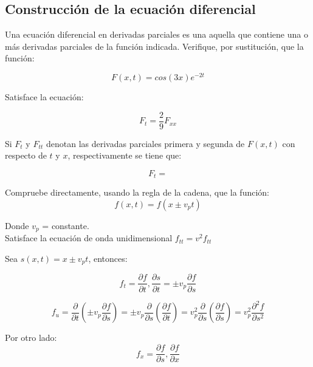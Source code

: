 \documentclass[]{article}
\begin{document}
\subsection{Construcción de la ecuación diferencial}

Una ecuación diferencial en derivadas parciales es una aquella que contiene una o más derivadas parciales de la función indicada. Verifique, por sustitución, que la función:

\begin{equation}
F(x,t)=cos(3x)e^{-2t}
\end{equation}

Satisface la ecuación:

\begin{equation}
F_t=\frac{2}{9}F_{xx}
\end{equation}

Si $F_t$ y $F_{tt}$ denotan las derivadas parciales primera y segunda de $F(x,t)$ con respecto de $t$ y $x$, respectivamente se tiene que:

\begin{equation}
F_t=
\end{equation}


Compruebe directamente, usando la regla de la cadena, que la función:\\

\begin{equation}
f(x,t)=f(x\pm v_pt)
\end{equation}

Donde $v_p$ = constante.\\

Satisface la ecuación de onda unidimensional $f_{tt}=v^2f_{tt}$

Sea $s(x,t)=x \pm v_p t$, entonces:

\begin{equation}
f_t=\frac{ \partial f}{\partial t},\frac{\partial s}{\partial t}= \pm v_p \frac{\partial f}{\partial s}
\end{equation}

\begin{equation}  
f_u=\frac{\partial}{\partial t} (\pm v_p \frac{\partial f}{\partial s})= \pm v_p \frac{\partial }{\partial s}(\frac{\partial f}{\partial t})=v_p^2 \frac{\partial }{\partial s} (\frac{\partial f}{\partial s})=v_p^2 \frac{\partial^2 f}{\partial s^2}
\end{equation}

Por otro lado:\\

\begin{equation}
f_x=\frac{\partial f}{\partial s},\frac{\partial f}{\partial x}
\end{equation}
\end{document}
